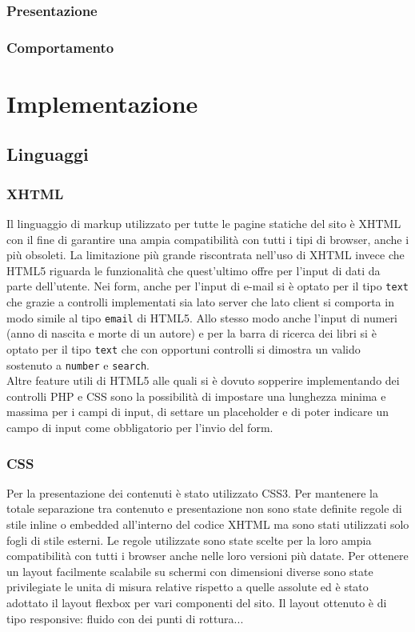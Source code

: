\documentclass[12pt,a4paper,headings=optiontohead]{article}
\begin{document}
\subsubsection{Presentazione}
\subsubsection{Comportamento}

\section{Implementazione}
\subsection{Linguaggi}
\subsubsection{XHTML}
Il linguaggio di markup utilizzato per tutte le pagine statiche del sito è XHTML con il fine di garantire una ampia compatibilità con tutti i tipi di browser, anche i più obsoleti. La limitazione più grande riscontrata nell'uso di XHTML invece che HTML5 riguarda le funzionalità che quest'ultimo offre per l'input di dati da parte dell'utente. Nei form, anche per l'input di e-mail si è optato per il tipo \texttt{text} che grazie a controlli implementati sia lato server che lato client si comporta in modo simile al tipo \texttt{email} di HTML5. Allo stesso modo anche l'input di numeri (anno di nascita e morte di un autore) e per la barra di ricerca dei libri si è optato per il tipo \texttt{text} che con opportuni controlli si dimostra un valido sostenuto a \texttt{number} e \texttt{search}. \\
Altre feature utili di HTML5 alle quali si è dovuto sopperire implementando dei controlli PHP e CSS sono la possibilità di impostare una lunghezza minima e massima per i campi di input, di settare un placeholder e di poter indicare un campo di input come obbligatorio per l'invio del form.

\subsubsection{CSS}
Per la presentazione dei contenuti è stato utilizzato CSS3. Per mantenere la totale separazione tra contenuto e presentazione non sono state definite regole di stile inline o embedded all'interno del codice XHTML ma sono stati utilizzati solo fogli di stile esterni. Le regole utilizzate sono state scelte per la loro ampia compatibilità con tutti i browser anche nelle loro versioni più datate. Per ottenere un layout facilmente scalabile su schermi con dimensioni diverse sono state privilegiate le unita di misura relative rispetto a quelle assolute ed è stato adottato il layout flexbox per vari componenti del sito. Il layout ottenuto è di tipo responsive: fluido con dei punti di rottura... %
\end{document}
